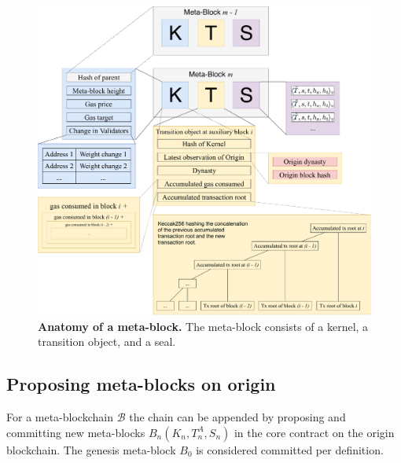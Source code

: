 \documentclass[12pt,a4paper]{article}
\begin{document}

\begin{figure}
    \centering
	\includegraphics[width=\textwidth]{meta_block}
	\caption{\textbf{Anatomy of a meta-block.}
		The meta-block consists of a kernel, a transition object, and a seal.
	}
	\label{fig:meta_block}
\end{figure}

\subsection{Proposing meta-blocks on origin}

For a meta-blockchain $\mathcal{B}$ the chain can be appended by proposing and committing new meta-blocks $B_n(K_n, T^A_n, S_n)$ in the core contract on the origin block\-chain.
The genesis meta-block $B_0$ is considered committed per definition.
\end{document}
